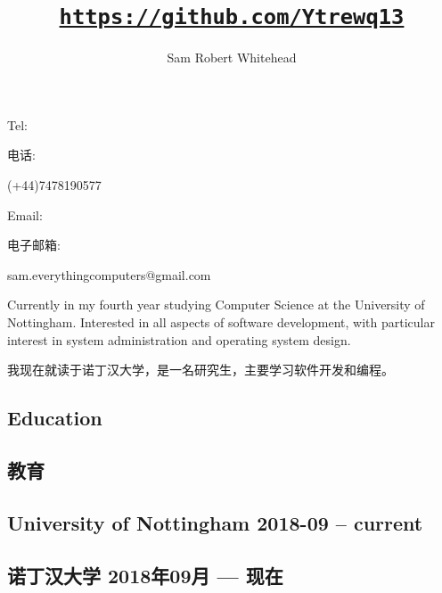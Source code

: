 \documentclass[cv.tex]{subfiles}
\begin{document}
    \title{\href{https://github.com/Ytrewq13}{\texttt{https://github.com/Ytrewq13}}}
    \author{Sam Robert Whitehead}

    \maketitle

    \pagestyle{empty}
    \thispagestyle{empty}

\begin{xen}
    Tel:
\end{xen}
\begin{xcn}
    电话:
\end{xcn}
    (+44)7478190577
    \hfill
\begin{xen}
    Email:
\end{xen}
\begin{xcn}
    电子邮箱:
\end{xcn}
    sam.everythingcomputers@gmail.com\\
    \vspace{1mm}
\begin{xen}
    Currently in my fourth year studying Computer Science at the University of
    Nottingham. Interested in all aspects of software development, with
    particular interest in system administration and operating system design.
\end{xen}
\begin{xcn}
    我现在就读于诺丁汉大学，是一名研究生，主要学习软件开发和编程。
\end{xcn}
\begin{xen}
    \section{Education}
\end{xen}
\begin{xcn}
    \section{教育}
\end{xcn}
\begin{xen}
    \subsection{University of Nottingham
        \hfill 2018-09 -- current}
\end{xen}
\begin{xcn}
        \subsection{诺丁汉大学
        \hfill 2018年09月 --- 现在}
\end{xcn}
\end{document}
